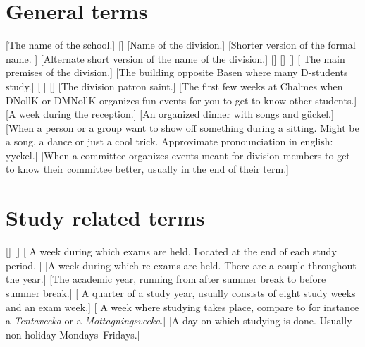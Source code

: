 \documentclass[a4paper]{dtek}
\begin{document}
\section{General terms}
\begin{description}
    [\formal The name of the school.]
    []
    [\formal Name of the division.]
    [Shorter version of the formal name. ]
    [Alternate short version of the name of the division.]
    []
    []
    []
    [ The main premises of the division.]
    [The building opposite Basen where many D-students study.]
    [ ]
    [\formal {}]
    [The division patron saint.]
    [The first few weeks at Chalmes when DNollK or DMNollK organizes fun events for you to get to know other students.]
    [A week during the reception.]
    [An organized dinner with songs and gückel.]
    [When a person or a group want to show off something during a sitting. Might be a song, a dance or just a cool trick. Approximate pronounciation in english: yyckel.]
    [When a committee organizes events meant for division members to get to know their committee better, usually in the end of their term.]
\end{description}

\section{Study related terms}
\begin{description}
    []
    []
    [ A week during which exams are held. Located at the end of each study period. ]
    [A week during which re-exams are held. There are a couple throughout the year.]
    [The academic year, running from after summer break to before summer break.]
    [ A quarter of a study year, usually consists of eight study weeks and an exam week.]
    [ A week where studying takes place, compare to for instance a \textit{Tentavecka} or a \textit{Mottagningsvecka}.]
    [A day on which studying is done. Usually non-holiday Mondays--Fridays.]
\end{description}
\end{document}
